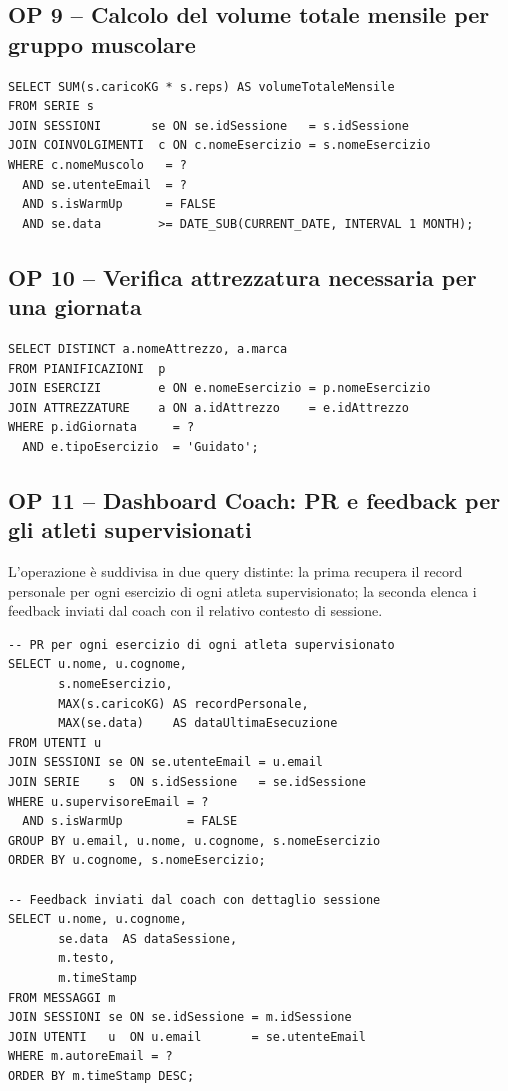 \documentclass[12pt]{report}
\begin{document}
\subsection*{OP 9 – Calcolo del volume totale mensile per gruppo muscolare}

\begin{lstlisting}[style=sql]
SELECT SUM(s.caricoKG * s.reps) AS volumeTotaleMensile
FROM SERIE s
JOIN SESSIONI       se ON se.idSessione   = s.idSessione
JOIN COINVOLGIMENTI  c ON c.nomeEsercizio = s.nomeEsercizio
WHERE c.nomeMuscolo   = ?
  AND se.utenteEmail  = ?
  AND s.isWarmUp      = FALSE
  AND se.data        >= DATE_SUB(CURRENT_DATE, INTERVAL 1 MONTH);
\end{lstlisting}

\subsection*{OP 10 – Verifica attrezzatura necessaria per una giornata}

\begin{lstlisting}[style=sql]
SELECT DISTINCT a.nomeAttrezzo, a.marca
FROM PIANIFICAZIONI  p
JOIN ESERCIZI        e ON e.nomeEsercizio = p.nomeEsercizio
JOIN ATTREZZATURE    a ON a.idAttrezzo    = e.idAttrezzo
WHERE p.idGiornata     = ?
  AND e.tipoEsercizio  = 'Guidato';
\end{lstlisting}

\subsection*{OP 11 – Dashboard Coach: PR e feedback per gli atleti supervisionati}

L'operazione è suddivisa in due query distinte: la prima recupera
il record personale per ogni esercizio di ogni atleta supervisionato;
la seconda elenca i feedback inviati dal coach con il relativo
contesto di sessione.

\begin{lstlisting}[style=sql]
-- PR per ogni esercizio di ogni atleta supervisionato
SELECT u.nome, u.cognome,
       s.nomeEsercizio,
       MAX(s.caricoKG) AS recordPersonale,
       MAX(se.data)    AS dataUltimaEsecuzione
FROM UTENTI u
JOIN SESSIONI se ON se.utenteEmail = u.email
JOIN SERIE    s  ON s.idSessione   = se.idSessione
WHERE u.supervisoreEmail = ?
  AND s.isWarmUp         = FALSE
GROUP BY u.email, u.nome, u.cognome, s.nomeEsercizio
ORDER BY u.cognome, s.nomeEsercizio;

-- Feedback inviati dal coach con dettaglio sessione
SELECT u.nome, u.cognome,
       se.data  AS dataSessione,
       m.testo,
       m.timeStamp
FROM MESSAGGI m
JOIN SESSIONI se ON se.idSessione = m.idSessione
JOIN UTENTI   u  ON u.email       = se.utenteEmail
WHERE m.autoreEmail = ?
ORDER BY m.timeStamp DESC;
\end{lstlisting}
\end{document}
